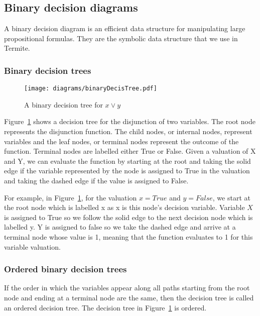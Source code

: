 
\subsection{Binary decision diagrams}

A binary decision diagram is an efficient data structure for manipulating large propositional formulas. They are the symbolic data structure that we use in Termite.

\subsubsection{Binary decision trees}

\begin{figure}[t]
\centering
\texttt{[image: diagrams/binaryDecisTree.pdf]}
\caption{A binary decision tree for $x \vee y$}
\label{fig:decis_tree}
\end{figure}

Figure~\ref{fig:decis_tree} shows a decision tree for the disjunction of two variables. The root node represents the disjunction function. The child nodes, or internal nodes, represent variables and the leaf nodes, or terminal nodes represent the outcome of the function. Terminal nodes are labelled either True or False. Given a valuation of X and Y, we can evaluate the function by starting at the root and taking the solid edge if the variable represented by the node is assigned to True in the valuation and taking the dashed edge if the value is assigned to False. 

For example, in Figure~\ref{fig:decis_tree}, for the valuation $x=True$ and $y=False$, we start at the root node which is labelled x as x is this node's decision variable. Variable $X$ is assigned to True so we follow the solid edge to the next decision node which is labelled y. Y is assigned to false so we take the dashed edge and arrive at a terminal node whose value is 1, meaning that the function evaluates to 1 for this variable valuation.

\subsubsection{Ordered binary decision trees}

If the order in which the variables appear along all paths starting from the root node and ending at a terminal node are the same, then the decision tree is called an ordered decision tree. The decision tree in Figure~\ref{fig:decis_tree} is ordered.


